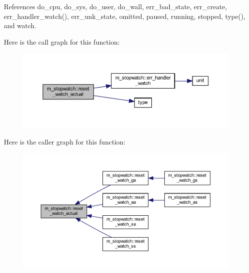 References do\+\_\+cpu, do\+\_\+sys, do\+\_\+user, do\+\_\+wall, err\+\_\+bad\+\_\+state, err\+\_\+create, err\+\_\+handler\+\_\+watch(), err\+\_\+unk\+\_\+state, omitted, paused, running, stopped, type(), and watch.

Here is the call graph for this function\+:
\nopagebreak
\begin{figure}[H]
\begin{center}
\leavevmode
\includegraphics[width=350pt]{namespacem__stopwatch_a70b2f142c88aae3054e06c0884197de2_cgraph}
\end{center}
\end{figure}
Here is the caller graph for this function\+:
\nopagebreak
\begin{figure}[H]
\begin{center}
\leavevmode
\includegraphics[width=350pt]{namespacem__stopwatch_a70b2f142c88aae3054e06c0884197de2_icgraph}
\end{center}
\end{figure}
\mbox{\label{namespacem__stopwatch_a05ff195ab84cacf71bbb2c646c562888}} 
